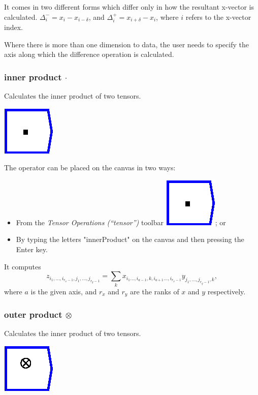 It comes in two different forms which differ only in how the resultant
x-vector is calculated. $\Delta_{i}^{-}=x_{i}-x_{i-\delta}$, and
$\Delta_{i}^{+}=x_{i+\delta}-x_{i}$, where $i$ refers to the x-vector
index.

Where there is more than one dimension to data, the user needs to
specify the axis along which the difference operation is calculated.

\subsubsection{inner product $\cdot$}

\label{Operation:innerProduct} Calculates the inner product of two
tensors.

\includegraphics{images/innerProduct}

The operator can be placed on the canvas in two ways:
\begin{itemize}
\item From the \emph{Tensor Operations (``tensor'')} toolbar \includegraphics{images/innerProduct};
or 
\item By typing the letters "innerProduct" on the canvas and then pressing
the Enter key.
\end{itemize}
It computes 
\[
z_{i_{1},\ldots,i_{r_{x}-1},j_{1},\ldots,j_{r_{y}-1}}=\sum_{k}x_{i_{1}\ldots,i_{a-1},k,i_{a+1}\ldots,i_{r_{x}-1}}y_{j_{1},\ldots,j_{r_{y}-1},k},
\]
where $a$ is the given axis, and $r_{x}$ and $r_{y}$ are the ranks
of $x$ and $y$ respectively.

\subsubsection{outer product $\otimes$}

\label{Operation:outerProduct} Calculates the inner product of two
tensors.

\includegraphics{images/outerProduct}

